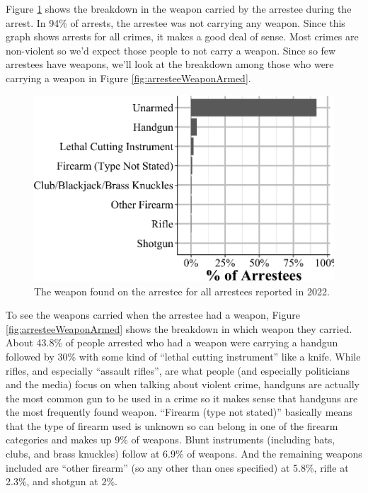 \documentclass[
  12pt,
  openany]{book}
\begin{document}
Figure \ref{fig:arresteeWeapon} shows the breakdown in the weapon carried by the arrestee during the arrest. In 94\% of arrests, the arrestee was not carrying any weapon. Since this graph shows arrests for all crimes, it makes a good deal of sense. Most crimes are non-violent so we'd expect those people to not carry a weapon. Since so few arrestees have weapons, we'll look at the breakdown among those who were carrying a weapon in Figure \ref{fig:arresteeWeaponArmed}.

\begin{figure}

{\centering \includegraphics[width=0.9\linewidth]{16_nibrs_arrestee_files/figure-latex/arresteeWeapon-1} 

}

\caption{The weapon found on the arrestee for all arrestees reported in 2022.}\label{fig:arresteeWeapon}
\end{figure}

To see the weapons carried when the arrestee had a weapon, Figure \ref{fig:arresteeWeaponArmed} shows the breakdown in which weapon they carried. About 43.8\% of people arrested who had a weapon were carrying a handgun followed by 30\% with some kind of ``lethal cutting instrument'' like a knife. While rifles, and especially ``assault rifles'', are what people (and especially politicians and the media) focus on when talking about violent crime, handguns are actually the most common gun to be used in a crime so it makes sense that handguns are the most frequently found weapon. ``Firearm (type not stated)'' basically means that the type of firearm used is unknown so can belong in one of the firearm categories and makes up 9\% of weapons. Blunt instruments (including bats, clubs, and brass knuckles) follow at 6.9\% of weapons. And the remaining weapons included are ``other firearm'' (so any other than ones specified) at 5.8\%, rifle at 2.3\%, and shotgun at 2\%.
\end{document}
